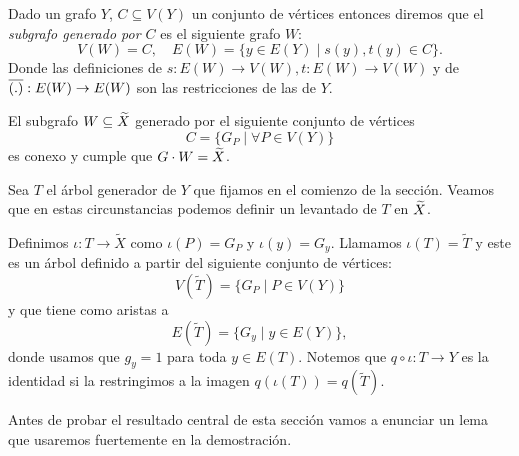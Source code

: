 \documentclass[tesis.tex]{subfiles}
\begin{document}
\begin{deff}
	Dado un grafo $Y$, $C \subseteq V(Y)$ un conjunto de vértices entonces diremos que el \emph{subgrafo generado por $C$} es el siguiente grafo $W$:
	\[
		V(W) = C, \quad E(W) = \{ y \in E(Y) \mid s(y), t(y) \in C \}.
	\]
	Donde las definiciones de $s:E(W) \to V(W), t:E(W) \to V(W)$ y de $\overline{(.)}:E(W) \to E(W)$ son las restricciones de las de $Y$.
\end{deff}

\begin{obs}\label{obs_subgrafo_dom_fund}
	El subgrafo $W \subseteq \widetilde X$ generado por el siguiente conjunto de vértices
		\[
		C = \{ G_{P} \mid \forall P \in V(Y) \} 
		\]
	es conexo y cumple que $G \cdot W = \widetilde X$.

\end{obs}

Sea $T$ el árbol generador de $Y$ que fijamos en el comienzo de la sección.
Veamos que en estas circunstancias podemos definir un levantado de $T$ en $\widetilde X$.


\begin{obs}\label{obs_levantado_arbol}
	Definimos $\iota: T \to \widetilde{X}$ como $\iota(P) = G_{P}$ y $\iota(y) = G_{y}$.
	Llamamos $\iota(T) = \widetilde{T}$ y este es un árbol definido a partir del siguiente conjunto de vértices:
	\[
	V(\widetilde T) = \{ G_P \mid P \in V(Y) \}
	\]
	y que tiene como aristas a
	\[
	E(\widetilde T) = \{ G_{y} \mid y \in E(Y) \},	
	\]
	donde usamos que $g_{y} = 1$ para toda $y \in E(T)$.
	Notemos que $q \circ \iota: T \to Y$ es la identidad si la restringimos a la imagen $q(\iota(T)) = q(\widetilde{T})$. 
\end{obs}

Antes de probar el resultado central de esta sección vamos a enunciar un lema que usaremos fuertemente en la demostración.

\end{document}
